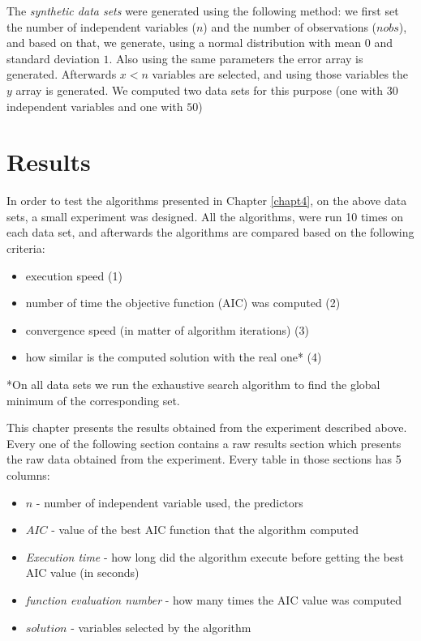The \textit{synthetic data sets} were generated using the following method: we first set the number of independent variables ($n$) and the number of observations ($nobs$), and based on that, we generate, using a normal distribution with mean $0$ and standard deviation $1$. Also using the same parameters the error array is generated. Afterwards $x < n$ variables are selected, and using those variables the $y$ array is generated. We computed two data sets for this purpose (one with $30$ independent variables and one with $50$)


\section{Results}
In order to test the algorithms presented in Chapter \ref{chapt4}, on the above data sets, a small experiment was designed. All the algorithms, were run 10 times on each data set, and afterwards the algorithms are compared based on the following criteria:
\begin{itemize}
	\item execution speed (1)
	\item number of time the objective function (AIC) was computed (2)
	\item convergence speed (in matter of algorithm iterations) (3)
	\item how similar is the computed solution with the real one* (4)
\end{itemize} 

*On all data sets we run the exhaustive search algorithm to find the global minimum of the corresponding set.

This chapter presents the results obtained from the experiment described above. Every one of the following section contains a raw results section which presents the raw data obtained from the experiment. Every table in those sections has 5 columns:
\begin{itemize}
	\item $n$ - number of independent variable used, the predictors
	\item $AIC$ - value of the best AIC function that the algorithm computed
	\item \textit{Execution time} - how long did the algorithm execute before getting the best AIC value (in seconds)
	\item \textit{function evaluation number} - how many times the AIC value was computed
	\item $solution$ - variables selected by the algorithm
\end{itemize}

